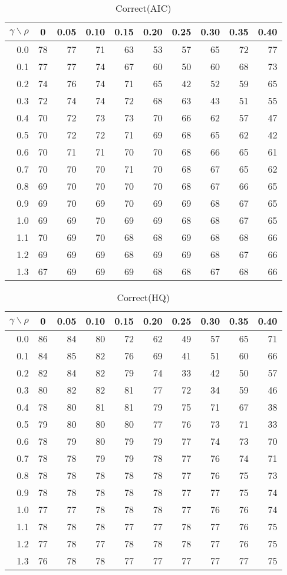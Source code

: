 \documentclass[12pt]{article}
\begin{document}
%
\begin{table}[!tbp]
\caption{Correct(AIC)}
 \begin{center}
 \begin{tabular}{r|rrrrrrrrr}\hline\hline
\multicolumn{1}{c|}{$\gamma\backslash\rho$}&\multicolumn{1}{c}{0}&\multicolumn{1}{c}{0.05}&\multicolumn{1}{c}{0.10}&\multicolumn{1}{c}{0.15}&\multicolumn{1}{c}{0.20}&\multicolumn{1}{c}{0.25}&\multicolumn{1}{c}{0.30}&\multicolumn{1}{c}{0.35}&\multicolumn{1}{c}{0.40}\tabularnewline
\hline
0.0&78&77&71&63&53&57&65&72&77\tabularnewline
0.1&77&77&74&67&60&50&60&68&73\tabularnewline
0.2&74&76&74&71&65&42&52&59&65\tabularnewline
0.3&72&74&74&72&68&63&43&51&55\tabularnewline
0.4&70&72&73&73&70&66&62&57&47\tabularnewline
0.5&70&72&72&71&69&68&65&62&42\tabularnewline
0.6&70&71&71&70&70&68&66&65&61\tabularnewline
0.7&70&70&70&71&70&68&67&65&62\tabularnewline
0.8&69&70&70&70&70&68&67&66&65\tabularnewline
0.9&69&70&69&70&69&69&68&67&65\tabularnewline
1.0&69&69&70&69&69&68&68&67&65\tabularnewline
1.1&70&69&70&68&68&69&68&68&66\tabularnewline
1.2&69&69&69&68&69&69&68&67&66\tabularnewline
1.3&67&69&69&69&68&68&67&68&66\tabularnewline
\hline
\end{tabular}

\end{center}

\end{table}

%
\begin{table}[!tbp]
\caption{Correct(HQ)}
 \begin{center}
 \begin{tabular}{r|rrrrrrrrr}\hline\hline
\multicolumn{1}{c|}{$\gamma\backslash\rho$}&\multicolumn{1}{c}{0}&\multicolumn{1}{c}{0.05}&\multicolumn{1}{c}{0.10}&\multicolumn{1}{c}{0.15}&\multicolumn{1}{c}{0.20}&\multicolumn{1}{c}{0.25}&\multicolumn{1}{c}{0.30}&\multicolumn{1}{c}{0.35}&\multicolumn{1}{c}{0.40}\tabularnewline
\hline
0.0&86&84&80&72&62&49&57&65&71\tabularnewline
0.1&84&85&82&76&69&41&51&60&66\tabularnewline
0.2&82&84&82&79&74&33&42&50&57\tabularnewline
0.3&80&82&82&81&77&72&34&59&46\tabularnewline
0.4&78&80&81&81&79&75&71&67&38\tabularnewline
0.5&79&80&80&80&77&76&73&71&33\tabularnewline
0.6&78&79&80&79&79&77&74&73&70\tabularnewline
0.7&78&78&79&79&78&77&76&74&71\tabularnewline
0.8&78&78&78&78&78&77&76&75&73\tabularnewline
0.9&78&78&78&78&78&77&77&75&74\tabularnewline
1.0&77&77&78&78&78&77&76&76&74\tabularnewline
1.1&78&78&78&77&77&78&77&76&75\tabularnewline
1.2&77&78&77&78&78&78&77&76&75\tabularnewline
1.3&76&78&78&77&77&77&77&77&75\tabularnewline
\hline
\end{tabular}

\end{center}

\end{table}
\end{document}
